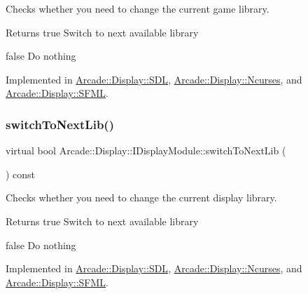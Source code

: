 Checks whether you need to change the current game library. 

\begin{DoxyReturn}{Returns}
true Switch to next available library 

false Do nothing 
\end{DoxyReturn}


Implemented in \mbox{\hyperlink{classArcade_1_1Display_1_1SDL_a3f197b6ea176410b4eb472d7e848eb10}{Arcade\+::\+Display\+::\+S\+DL}}, \mbox{\hyperlink{classArcade_1_1Display_1_1Ncurses_a915b07b0cc03a96303c0d01b59652996}{Arcade\+::\+Display\+::\+Ncurses}}, and \mbox{\hyperlink{classArcade_1_1Display_1_1SFML_af47adddb8c2f26b5ee0109abce03e27a}{Arcade\+::\+Display\+::\+S\+F\+ML}}.

\mbox{\label{classArcade_1_1Display_1_1IDisplayModule_a0de47361c9d47bf8fc52070b945f23b7}} 
\subsubsection{\texorpdfstring{switchToNextLib()}{switchToNextLib()}}
{\footnotesize\ttfamily virtual bool Arcade\+::\+Display\+::\+I\+Display\+Module\+::switch\+To\+Next\+Lib (\begin{DoxyParamCaption}{ }\end{DoxyParamCaption}) const\hspace{0.3cm}{\ttfamily [pure virtual]}}



Checks whether you need to change the current display library. 

\begin{DoxyReturn}{Returns}
true Switch to next available library 

false Do nothing 
\end{DoxyReturn}


Implemented in \mbox{\hyperlink{classArcade_1_1Display_1_1SDL_a91bee5a87dfcacb4da9d6d148dc52a2b}{Arcade\+::\+Display\+::\+S\+DL}}, \mbox{\hyperlink{classArcade_1_1Display_1_1Ncurses_a921c8a8559cd48419aafda8e34c1b653}{Arcade\+::\+Display\+::\+Ncurses}}, and \mbox{\hyperlink{classArcade_1_1Display_1_1SFML_a3e7d385aaa46e9137f41e4d78d5e233c}{Arcade\+::\+Display\+::\+S\+F\+ML}}.

